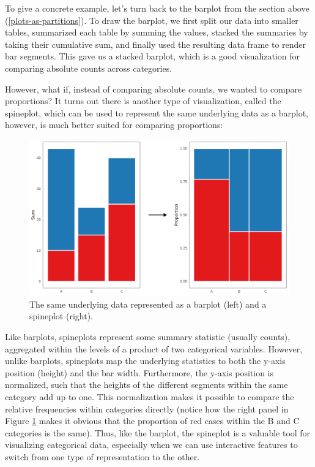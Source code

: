 \documentclass[
]{book}
\theoremstyle{definition}
\theoremstyle{definition}
\theoremstyle{definition}
\theoremstyle{definition}
\theoremstyle{remark}
\begin{document}
To give a concrete example, let's turn back to the barplot from the section above (\ref{plots-as-partitions}). To draw the barplot, we first split our data into smaller tables, summarized each table by summing the values, stacked the summaries by taking their cumulative sum, and finally used the resulting data frame to render bar segments. This gave us a stacked barplot, which is a good visualization for comparing absolute counts across categories.

However, what if, instead of comparing absolute counts, we wanted to compare proportions? It turns out there is another type of visualization, called the spineplot, which can be used to represent the same underlying data as a barplot, however, is much better suited for comparing proportions:

\begin{figure}

{\centering \includegraphics[width=1\linewidth,height=1\textheight]{./figures/barplot-spineplot} 

}

\caption{The same underlying data represented as a barplot (left) and a spineplot (right).}\label{fig:barplot-spineplot}
\end{figure}

Like barplots, spineplots represent some summary statistic (usually counts), aggregated within the levels of a product of two categorical variables. However, unlike barplots, spineplots map the underlying statistics to both the y-axis position (height) and the bar width. Furthermore, the y-axis position is normalized, such that the heights of the different segments within the same category add up to one. This normalization makes it possible to compare the relative frequencies within categories directly (notice how the right panel in Figure \ref{fig:barplot-spineplot} makes it obvious that the proportion of red cases within the B and C categories is the same). Thus, like the barplot, the spineplot is a valuable tool for visualizing categorical data, especially when we can use interactive features to switch from one type of representation to the other.
\end{document}
